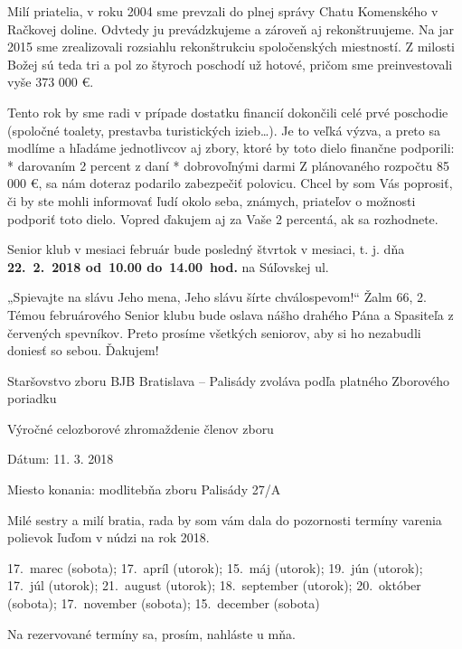 Milí priatelia, v roku 2004 sme prevzali do plnej správy Chatu Komenského v Račkovej doline. Odvtedy ju prevádzkujeme a zároveň aj rekonštruujeme. Na jar 2015 sme zrealizovali rozsiahlu rekonštrukciu spoločenských miestností. Z milosti Božej sú teda tri a pol zo štyroch poschodí už hotové, pričom sme preinvestovali vyše 373 000 €.

Tento rok by sme radi v prípade dostatku financií dokončili celé prvé poschodie (spoločné toalety, prestavba turistických izieb…). Je to veľká výzva, a preto sa modlíme a hľadáme jednotlivcov aj zbory, ktoré by toto dielo finančne podporili:
\begitems
* darovaním 2 percent z daní
* dobrovoľnými darmi
\enditems
Z plánovaného rozpočtu 85 000 €, sa nám doteraz podarilo zabezpečiť polovicu. Chcel by som Vás poprosiť, či by ste mohli informovať ľudí okolo seba, známych, priateľov o možnosti podporiť toto dielo. Vopred ďakujem aj za Vaše 2 percentá, ak sa rozhodnete.



Senior klub v mesiaci február bude posledný štvrtok v mesiaci, t. j. dňa {\bf 22.~2.~2018 od~10.00 do~14.00~hod.} na Súľovskej ul.

„Spievajte na slávu Jeho mena, Jeho slávu šírte chválospevom!“ Žalm 66, 2.
Témou februárového Senior klubu bude oslava nášho drahého Pána a Spasiteľa z červených spevníkov. Preto prosíme všetkých seniorov, aby si ho nezabudli doniesť so sebou.
Ďakujem!



Staršovstvo zboru BJB Bratislava – Palisády zvoláva podľa platného Zborového poriadku

Výročné celozborové zhromaždenie členov zboru

Dátum: 11. 3. 2018

Miesto konania: modlitebňa zboru Palisády 27/A


Milé sestry a milí bratia, rada by som vám dala do pozornosti termíny varenia polievok ľuďom v núdzi na rok 2018.

17.~marec (sobota); 17.~apríl (utorok); 15.~máj (utorok); 19.~jún (utorok); 17.~júl (utorok); 21.~august (utorok); 18.~september (utorok); 20.~október (sobota); 17.~november (sobota); 15.~december (sobota)

Na rezervované termíny sa, prosím, nahláste u mňa.

